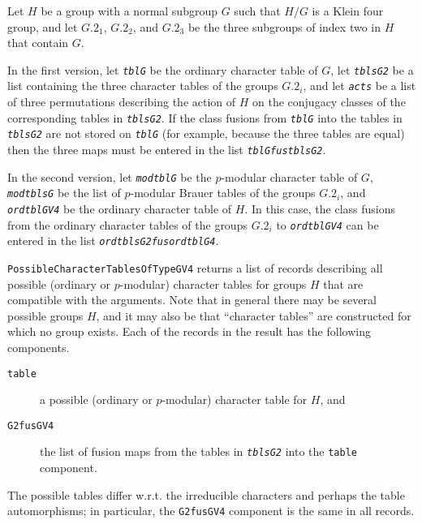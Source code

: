 \documentclass[a4paper,11pt]{report}
\begin{document}
{{{ Let $H$ be a group with a normal subgroup $G$ such that $H/G$ is a Klein four group, and let $G.2_1$, $G.2_2$, and $G.2_3$ be the three subgroups of index two in $H$ that contain $G$. 

 In the first version, let \mbox{\texttt{\mdseries\slshape tblG}} be the ordinary character table of $G$, let \mbox{\texttt{\mdseries\slshape tblsG2}} be a list containing the three character tables of the groups $G.2_i$, and let \mbox{\texttt{\mdseries\slshape acts}} be a list of three permutations describing the action of $H$ on the conjugacy classes of the corresponding tables in \mbox{\texttt{\mdseries\slshape tblsG2}}. If the class fusions from \mbox{\texttt{\mdseries\slshape tblG}} into the tables in \mbox{\texttt{\mdseries\slshape tblsG2}} are not stored on \mbox{\texttt{\mdseries\slshape tblG}} (for example, because the three tables are equal) then the three maps must be
entered in the list \mbox{\texttt{\mdseries\slshape tblGfustblsG2}}. 

 In the second version, let \mbox{\texttt{\mdseries\slshape modtblG}} be the $p$-modular character table of $G$, \mbox{\texttt{\mdseries\slshape modtblsG}} be the list of $p$-modular Brauer tables of the groups $G.2_i$, and \mbox{\texttt{\mdseries\slshape ordtblGV4}} be the ordinary character table of $H$. In this case, the class fusions from the ordinary character tables of the
groups $G.2_i$ to \mbox{\texttt{\mdseries\slshape ordtblGV4}} can be entered in the list \mbox{\texttt{\mdseries\slshape ordtblsG2fusordtblG4}}. 

 \texttt{PossibleCharacterTablesOfTypeGV4} returns a list of records describing all possible (ordinary or $p$-modular) character tables for groups $H$ that are compatible with the arguments. Note that in general there may be
several possible groups $H$, and it may also be that ``character tables'' are constructed for which no group exists. Each of the records in the result
has the following components. 

 
\begin{description}
\item[{\texttt{table}}]  a possible (ordinary or $p$-modular) character table for $H$, and 
\item[{\texttt{G2fusGV4}}]  the list of fusion maps from the tables in \mbox{\texttt{\mdseries\slshape tblsG2}} into the \texttt{table} component. 
\end{description}
 

 The possible tables differ w.r.t. the irreducible characters and perhaps the
table automorphisms; in particular, the \texttt{G2fusGV4} component is the same in all records. 

}}}
\end{document}
